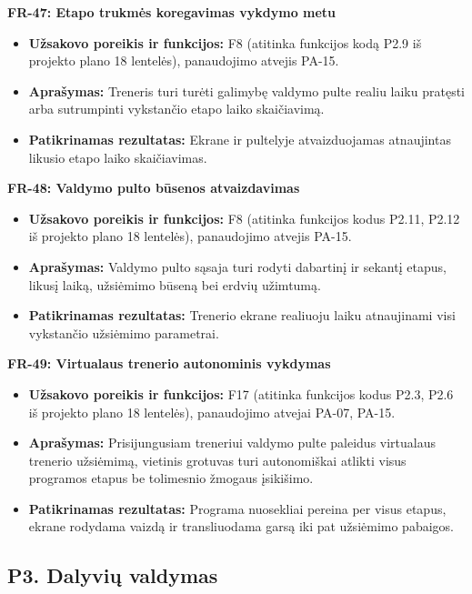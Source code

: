 \vspace{0.3cm}
\noindent\textbf{FR-47: Etapo trukmės koregavimas vykdymo metu}
\begin{itemize}
    \item \textbf{Užsakovo poreikis ir funkcijos:} F8 (atitinka funkcijos kodą P2.9 iš projekto plano 18 lentelės), panaudojimo atvejis PA-15.
    \item \textbf{Aprašymas:} Treneris turi turėti galimybę valdymo pulte realiu laiku pratęsti arba sutrumpinti vykstančio etapo laiko skaičiavimą.
    \item \textbf{Patikrinamas rezultatas:} Ekrane ir pultelyje atvaizduojamas atnaujintas likusio etapo laiko skaičiavimas.
\end{itemize}

\vspace{0.3cm}
\noindent\textbf{FR-48: Valdymo pulto būsenos atvaizdavimas}
\begin{itemize}
    \item \textbf{Užsakovo poreikis ir funkcijos:} F8 (atitinka funkcijos kodus P2.11, P2.12 iš projekto plano 18 lentelės), panaudojimo atvejis PA-15.
    \item \textbf{Aprašymas:} Valdymo pulto sąsaja turi rodyti dabartinį ir sekantį etapus, likusį laiką, užsiėmimo būseną bei erdvių užimtumą.
    \item \textbf{Patikrinamas rezultatas:} Trenerio ekrane realiuoju laiku atnaujinami visi vykstančio užsiėmimo parametrai.
\end{itemize}

\vspace{0.3cm}
\noindent\textbf{FR-49: Virtualaus trenerio autonominis vykdymas}
\begin{itemize}
    \item \textbf{Užsakovo poreikis ir funkcijos:} F17 (atitinka funkcijos kodus P2.3, P2.6 iš projekto plano 18 lentelės), panaudojimo atvejai PA-07, PA-15.
    \item \textbf{Aprašymas:} Prisijungusiam treneriui valdymo pulte paleidus virtualaus trenerio užsiėmimą, vietinis grotuvas turi autonomiškai atlikti visus programos etapus be tolimesnio žmogaus įsikišimo.
    \item \textbf{Patikrinamas rezultatas:} Programa nuosekliai pereina per visus etapus, ekrane rodydama vaizdą ir transliuodama garsą iki pat užsiėmimo pabaigos.
\end{itemize}

\subsection{P3. Dalyvių valdymas}


